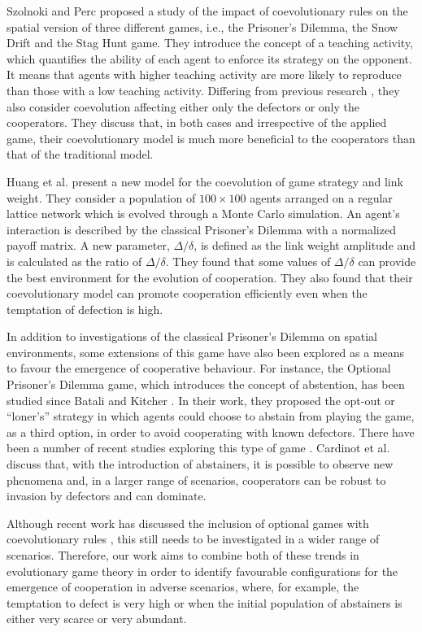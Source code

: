 \documentclass{llncs}
\begin{document}
Szolnoki and Perc \cite{Szolnoki2009} proposed a study of the impact of
coevolutionary rules on the spatial version of three different games, i.e., the
Prisoner's Dilemma, the Snow Drift and the Stag Hunt game. They introduce the
concept of a teaching activity, which quantifies the ability of each agent to
enforce its strategy on the opponent. It means that agents with higher teaching
activity are more likely to reproduce than those with a low teaching activity.
Differing from previous research \cite{Zimmermann2004,Zimmermann2001}, they
also consider coevolution affecting either only the defectors or only the
cooperators. They discuss that, in both cases and irrespective of the applied
game, their coevolutionary model is much more beneficial to the cooperators
than that of the traditional model.

Huang et al. \cite{Huang2015} present a new model for the coevolution of game
strategy and link weight. They consider a population of $100 \times 100$ agents
arranged on a regular lattice network which is evolved through a Monte Carlo
simulation.  An agent's interaction is described by the classical Prisoner's
Dilemma with a normalized payoff matrix. A new parameter, $\Delta/\delta$, is
defined as the link weight amplitude and is calculated as the ratio of
$\Delta/\delta$. They found that some values of $\Delta/\delta$ can provide the
best environment for the evolution of cooperation. They also found that their
coevolutionary model can promote cooperation efficiently even when the
temptation of defection is high.

In addition to investigations of the classical Prisoner's Dilemma on spatial
environments, some extensions of this game have also been explored as a means
to favour the emergence of cooperative behaviour. For instance, the Optional
Prisoner's Dilemma game, which introduces the concept of abstention, has been
studied since Batali and Kitcher \cite{Batali1995}. In their work, they
proposed the opt-out or ``loner's'' strategy in which agents could choose to
abstain from playing the game, as a third option, in order to avoid cooperating
with known defectors.  There have been a number of recent studies exploring
this type of game \cite{Xia2015,Ghang2015,Olejarz2015,Jeong2014,Hauert2008}.
Cardinot et al. \cite{Cardinot2016sab} discuss that, with the introduction of
abstainers, it is possible to observe new phenomena and, in a larger range of
scenarios, cooperators can be robust to invasion by defectors and can
dominate.

Although recent work has discussed the inclusion of optional games with
coevolutionary rules \cite{Cardinot2016ecta}, this still needs to be investigated
in a wider range of scenarios. Therefore, our work aims to combine both of
these trends in evolutionary game theory in order to identify favourable
configurations for the emergence of cooperation in adverse scenarios, where,
for example, the temptation to defect is very high or when the initial
population of abstainers is either very scarce or very abundant.
\end{document}
